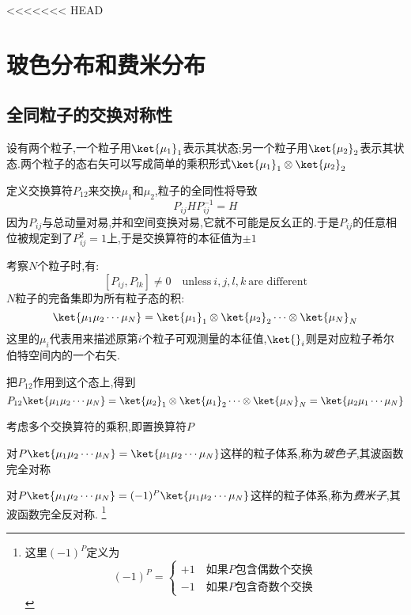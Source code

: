 <<<<<<< HEAD

\section{玻色分布和费米分布}

\subsection{全同粒子的交换对称性}
    设有两个粒子,一个粒子用$\ket{\mu_1}_1$表示其状态;另一个粒子用$\ket{\mu_2}_2$表示其状态.两个粒子的态右矢可以写成简单的乘积形式$\ket{\mu_1}_1 \otimes \ket{\mu_2}_2$

    定义交换算符$P_{12}$来交换$\mu_1$和$\mu_2$,粒子的全同性将导致
    \[P_{ij} H P_{ij}^{-1}=H\]
    因为$P_{ij}$与总动量对易,并和空间变换对易,它就不可能是反幺正的.于是$P_{ij}$的任意相位被规定到了$P_{ij}^{2}=1$上,于是交换算符的本征值为$\pm 1$

    考察$N$个粒子时,有:
    \[[P_{ij},P_{lk}]\neq 0 \quad \text{unless} ~i,j,l,k ~\text{are different}\]
    $N$粒子的完备集即为所有粒子态的积:
    \begin{equation}
      \ket{\mu_{1}\mu_2\cdots\mu_N}=\ket{\mu_1}_1 \otimes \ket{\mu_2}_2 \cdots \otimes \ket{\mu_N}_N
    \end{equation}
    这里的$\mu_i$代表用来描述原第$i$个粒子可观测量的本征值,$\ket{ }_i$则是对应粒子希尔伯特空间内的一个右矢.

    把$P_{12}$作用到这个态上,得到
    \begin{equation}
      P_{12}\ket{\mu_1\mu_2\cdots\mu_N}=\ket{\mu_2}_1 \otimes \ket{\mu_1}_2 \cdots\otimes \ket{\mu_N}_N=\ket{\mu_2 \mu_1 \cdots \mu_N}
    \end{equation}
    
    \vspace*{0.5cm
    }
    考虑多个交换算符的乘积,即置换算符$P$

    对$P\ket{\mu_1 \mu_2 \cdots \mu_N}=\ket{\mu_1 \mu_2 \cdots \mu_N}$这样的粒子体系,称为\emph{玻色子},其波函数完全对称

    对$P\ket{\mu_1 \mu_2 \cdots \mu_N}=(-1)^{P} \ket{\mu_1 \mu_2 \cdots \mu_N}$这样的粒子体系,称为\emph{费米子},其波函数完全反对称.
    \footnote{这里$(-1)^{P}$定义为
    \begin{equation}
      (-1)^{P}=\left\{ 
        \begin{aligned}
         +1\quad\text{如果$P$包含偶数个交换}\\
         -1\quad\text{如果$P$包含奇数个交换} 
        \end{aligned}
      \right.
    \end{equation}
    }
    
